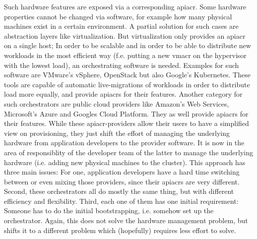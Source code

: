 
Such hardware features are exposed via a corresponding \gls{apiacr}. Some hardware properties cannot be changed via software, for example how many physical machines exist in a certain environment. A partial solution for such cases are abstraction layers like virtualization.
\newline
But virtualization only provides an \gls{apiacr} on a single host; In order to be scalable and in order to be able to distribute new workloads in the most efficient way (f.e. putting a new \gls{vmacr} on the hypervisor with the lowest load), an orchestrating software is needed. Examples for such software are VMware's vSphere, OpenStack but also Google's Kubernetes.
\newline
These tools are capable of automatic live-migrations of workloads in order to distribute load more equally, and provide \gls{apiacr}s for their features. 
\newline
Another category for such orchestrators are public cloud providers like Amazon's Web Services, Microsoft's Azure and Googles Cloud Platform. They as well provide \gls{apiacr}s for their features.
\newline
While these \gls{apiacr}-providers allow their users to have a simplified view on provisioning, they just shift the effort of managing the underlying hardware from application developers to the provider software. It is now in the area of responsiblity of the developer team of the latter to manage the underlying hardware (i.e. adding new physical machines to the cluster).
\newline
This approach has three main issues: For one, application developers have a hard time switching between or even mixing those providers, since their \gls{apiacr}s are very different. Second, these orchestrators all do mostly the same thing, but with different efficiency and flexibility. Third, each one of them has one initial requirement: Someone has to do the initial bootstrapping, i.e. somehow set up the orchestrator. Again, this does not solve the hardware management problem, but shifts it to a different problem which (hopefully) requires less effort to solve.
